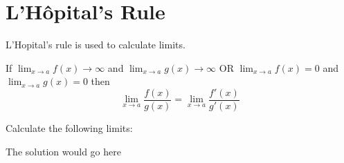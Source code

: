 \section*{L'H\^opital's Rule}
L'Hopital's rule is used to calculate limits.

If $\displaystyle{\lim_{x\to a} f(x)\to\infty}$ and $\displaystyle{\lim_{x\to a} g(x)\to\infty}$ OR $\displaystyle{\lim_{x\to a} f(x)=0}$ and $\displaystyle{\lim_{x\to a} g(x)=0}$   then
$$\lim_{x\to a} \frac{f(x)}{g(x)} = \lim_{x\to a} \frac{f'(x)}{g'(x)}$$ 

\begin{questions}

\question
Calculate the following limits:

\begin{solution}
  The solution would go here
\end{solution}

\end{questions}
